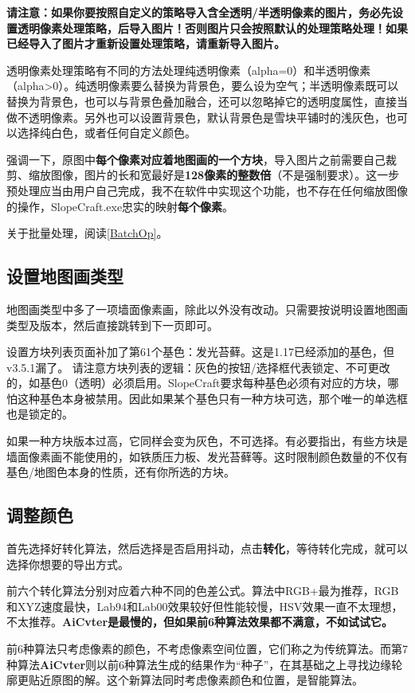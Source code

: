 \documentclass[UTF8]{ctexart}
\begin{document}
    \textbf{请注意：如果你要按照自定义的策略导入含全透明/半透明像素的图片，务必先设置透明像素处理策略，后导入图片！否则图片只会按照默认的处理策略处理！如果已经导入了图片才重新设置处理策略，请重新导入图片。}

    透明像素处理策略有不同的方法处理纯透明像素（alpha=0）和半透明像素（alpha>0）。纯透明像素要么替换为背景色，要么设为空气；半透明像素既可以替换为背景色，也可以与背景色叠加融合，还可以忽略掉它的透明度属性，直接当做不透明像素。另外也可以设置背景色，默认背景色是雪块平铺时的浅灰色，也可以选择纯白色，或者任何自定义颜色。

    强调一下，原图中\textbf{每个像素对应着地图画的一个方块}，导入图片之前需要自己裁剪、缩放图像，图片的长和宽最好是\textbf{128像素的整数倍}（不是强制要求）。这一步预处理应当由用户自己完成，我不在软件中实现这个功能，也不存在任何缩放图像的操作，SlopeCraft.exe忠实的映射\textbf{每个像素}。

    关于批量处理，阅读\ref{BatchOp}。

    \subsection{设置地图画类型}
    地图画类型中多了一项墙面像素画，除此以外没有改动。只需要按说明设置地图画类型及版本，然后直接跳转到下一页即可。

    设置方块列表页面补加了第61个基色：发光苔藓。这是1.17已经添加的基色，但v3.5.1漏了。
    请注意方块列表的逻辑：灰色的按钮/选择框代表锁定、不可更改的，如基色0（透明）必须启用。SlopeCraft要求每种基色必须有对应的方块，哪怕这种基色本身被禁用。因此如果某个基色只有一种方块可选，那个唯一的单选框也是锁定的。
    
    如果一种方块版本过高，它同样会变为灰色，不可选择。有必要指出，有些方块是墙面像素画不能使用的，如铁质压力板、发光苔藓等。这时限制颜色数量的不仅有基色/地图色本身的性质，还有你所选的方块。

    \subsection{调整颜色}
    
    首先选择好转化算法，然后选择是否启用抖动，点击\textbf{转化}，等待转化完成，就可以选择你想要的导出方式。
    
    前六个转化算法分别对应着六种不同的色差公式。算法中RGB+最为推荐，RGB和XYZ速度最快，Lab94和Lab00效果较好但性能较慢，HSV效果一直不太理想，不太推荐。\textbf{AiCvter是最慢的，但如果前6种算法效果都不满意，不如试试它。}
    
    前6种算法只考虑像素的颜色，不考虑像素空间位置，它们称之为传统算法。而第7种算法\textbf{AiCvter}则以前6种算法生成的结果作为“种子”，在其基础之上寻找边缘轮廓更贴近原图的解。这个新算法同时考虑像素颜色和位置，是智能算法。
\end{document}
